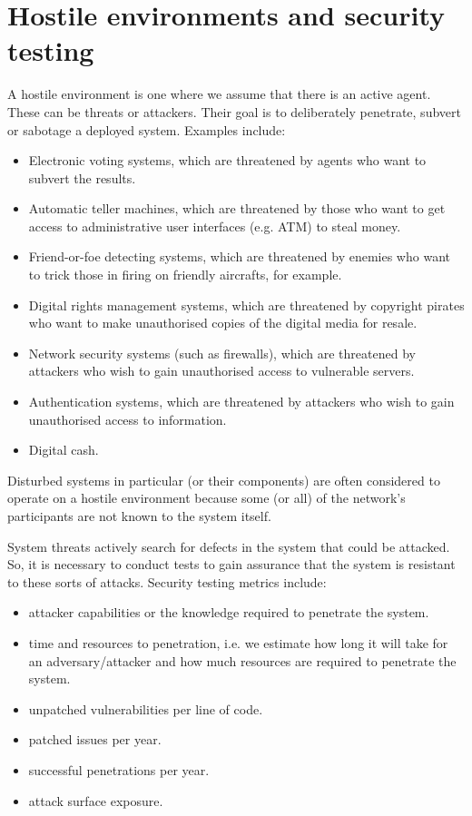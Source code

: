 \documentclass[a4paper, openany]{memoir}
\begin{document}
\section{Hostile environments and security testing}
A hostile environment is one where we assume that there is an active agent. These can be threats or attackers. Their goal is to deliberately penetrate, subvert or sabotage a deployed system. Examples include:
\begin{itemize}
    \item Electronic voting systems, which are threatened by agents who want to subvert the results.
    \item Automatic teller machines, which are threatened by those who want to get access to administrative user interfaces (e.g. ATM) to steal money.
    \item Friend-or-foe detecting systems, which are threatened by enemies who want to trick those in firing on friendly aircrafts, for example.
    \item Digital rights management systems, which are threatened by copyright pirates who want to make unauthorised copies of the digital media for resale.
    \item Network security systems (such as firewalls), which are threatened by attackers who wish to gain unauthorised access to vulnerable servers.
    \item Authentication systems, which are threatened by attackers who wish to gain unauthorised access to information.
    \item Digital cash.
\end{itemize}

Disturbed systems in particular (or their components) are often considered to operate on a hostile environment because some (or all) of the network's participants are not known to the system itself.

System threats actively search for defects in the system that could be attacked. So, it is necessary to conduct tests to gain assurance that the system is resistant to these sorts of attacks. Security testing metrics include:
\begin{itemize}
    \item attacker capabilities or the knowledge required to penetrate the system.
    \item time and resources to penetration, i.e. we estimate how long it will take for an adversary/attacker and how much resources are required to penetrate the system.
    \item unpatched vulnerabilities per line of code.
    \item patched issues per year.
    \item successful penetrations per year.
    \item attack surface exposure.
\end{itemize}
\end{document}
